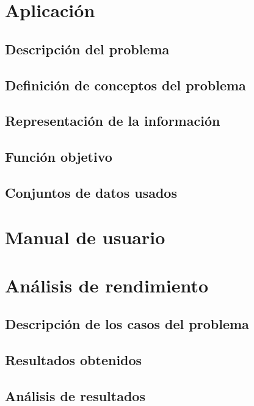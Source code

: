 \documentclass{article}
\begin{document}
	\section{Aplicación}
	\subsection{Descripción del problema}
	
	\subsection{Definición de conceptos del problema}
	
	\subsection{Representación de la información}
	
	\subsection{Función objetivo}
	
	\subsection{Conjuntos de datos usados}
	
	\section{Manual de usuario}
	
	\section{Análisis de rendimiento}
	\subsection{Descripción de los casos del problema}
	
	\subsection{Resultados obtenidos}
	
	\subsection{Análisis de resultados}
\end{document}
